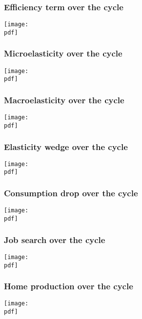 \documentclass[12pt,xcolor={dvipsnames},hyperref={pdftex,pdfpagemode=UseNone,hidelinks,pdfdisplaydoctitle=true},usepdftitle=false]{beamer}
\def\pdf{xui.pdf}
\begin{document}
\begin{frame}
\frametitle{Efficiency term over the cycle}
\texttt{[image: \\pdf]}%
\end{frame}


\begin{frame}
\frametitle{Microelasticity over the cycle}
\texttt{[image: \\pdf]}%
\end{frame}


\begin{frame}
\frametitle{Macroelasticity over the cycle}
\texttt{[image: \\pdf]}%
\end{frame}


\begin{frame}
\frametitle{Elasticity wedge over the cycle}
\texttt{[image: \\pdf]}%
\end{frame}

\begin{frame}
\frametitle{Consumption drop over the cycle}
\texttt{[image: \\pdf]}%
\end{frame}

\begin{frame}
\frametitle{Job search over the cycle}
\texttt{[image: \\pdf]}%
\end{frame}

\begin{frame}
\frametitle{Home production over the cycle}
\texttt{[image: \\pdf]}%
\end{frame}
\end{document}

